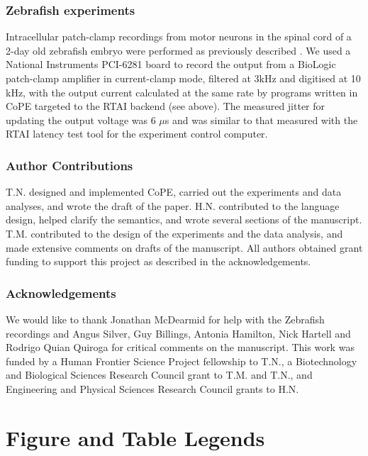 \documentclass[11pt]{article}
\begin{document}
\subsubsection*{Zebrafish experiments}

Intracellular patch-clamp recordings from motor neurons in the spinal
cord of a 2-day old zebrafish embryo were performed as previously
described \citep{McDearmid2006}. We used a National Instruments PCI-6281
board to
record the output from a BioLogic patch-clamp amplifier in
current-clamp mode, filtered at 3kHz and digitised at 10 kHz, with the
output current calculated at the same rate by programs written in
CoPE targeted to the RTAI backend (see
above). The measured jitter for updating the output voltage was 6
$\mu$s and was similar to that measured with the RTAI latency test
tool for the experiment control computer.

\subsubsection*{Author Contributions}  

T.N. designed and implemented CoPE, carried out the experiments and
data analyses, and wrote the draft of the paper. H.N. contributed to
the language design, helped clarify the semantics, and wrote several
sections of the manuscript. T.M. contributed to the design of the
experiments and the data analysis, and made extensive comments on
drafts of the manuscript. All authors obtained grant funding to
support this project as described in the acknowledgements.

\subsubsection*{Acknowledgements}  

We would like to thank Jonathan McDearmid for help with the Zebrafish
recordings and Angus Silver, Guy Billings, Antonia Hamilton, Nick
Hartell and Rodrigo Quian Quiroga for critical comments on the
manuscript. This work was funded by a Human Frontier Science Project
fellowship to T.N., a Biotechnology and Biological Sciences Research
Council grant to T.M. and T.N., and Engineering and Physical Sciences Research
Council grants to H.N.







\pagebreak

\section* {Figure and Table Legends}
\end{document}
